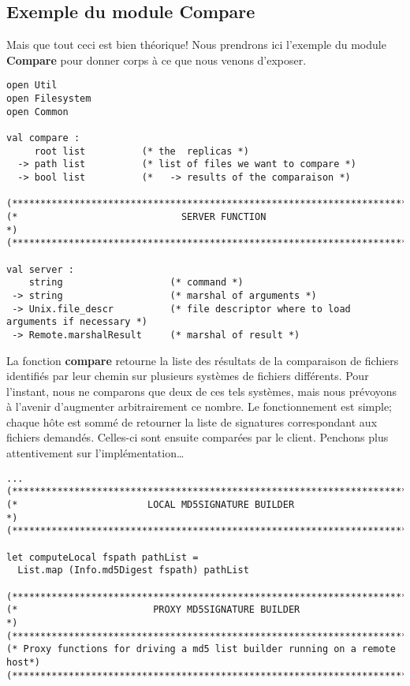 \documentclass[11pt]{report}
\newcommand{\func}[1]{\textbf{#1}}
\newcommand{\modu}[1]{\textbf{#1}}
\begin{document}
{\subsection{Exemple du module Compare}
Mais que tout ceci est bien th\'eorique! Nous prendrons ici 
l'exemple du module \modu{Compare} pour donner corps \`a ce que nous venons 
d'exposer.
\begin{verbatim}
open Util
open Filesystem
open Common

val compare :
     root list          (* the  replicas *)
  -> path list          (* list of files we want to compare *)
  -> bool list          (*   -> results of the comparaison *)

(**************************************************************************)
(*                             SERVER FUNCTION                            *)
(**************************************************************************)

val server :
    string                   (* command *)
 -> string                   (* marshal of arguments *)
 -> Unix.file_descr          (* file descriptor where to load arguments if necessary *)
 -> Remote.marshalResult     (* marshal of result *)
\end{verbatim} 
La fonction \func{compare} retourne la liste des r\'esultats de la comparaison
de fichiers identifi\'es par leur chemin sur plusieurs syst\`emes de fichiers 
diff\'erents. Pour l'instant, nous ne comparons que deux de ces tels syst\`emes,
mais nous pr\'evoyons \`a l'avenir d'augmenter arbitrairement ce nombre. 
Le fonctionnement est simple; chaque h\^ote est somm\'e de retourner la liste
de signatures correspondant aux fichiers demand\'es. Celles-ci sont ensuite
compar\'ees par le client.
Penchons plus attentivement sur l'impl\'ementation\ldots
\begin{verbatim}
...
(**************************************************************************)
(*                       LOCAL MD5SIGNATURE BUILDER                       *)
(**************************************************************************)

let computeLocal fspath pathList =
  List.map (Info.md5Digest fspath) pathList

(**************************************************************************)
(*                        PROXY MD5SIGNATURE BUILDER                      *)
(**************************************************************************)
(* Proxy functions for driving a md5 list builder running on a remote host*)
(**************************************************************************)


\end{verbatim}}
\end{document}
